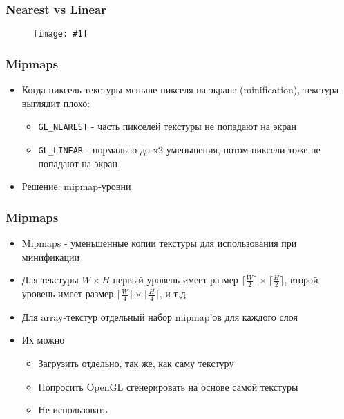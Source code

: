 \documentclass{beamer}
\newcommand{\slideimage}[1]{
  \begin{figure}
    \begin{adjustbox}{width=\textwidth, totalheight=\textheight-2\baselineskip-2\baselineskip,keepaspectratio}
      \texttt{[image: \#1]}
    \end{adjustbox}
  \end{figure}
}
\begin{document}
\begin{frame}
\frametitle{Nearest vs Linear}
\slideimage{nearest_linear.png}
\end{frame}

\begin{frame}[fragile]
\frametitle{Mipmaps}
\begin{itemize}
\item Когда пиксель текстуры меньше пикселя на экране (minification), текстура выглядит плохо:
\begin{itemize}
\item \verb|GL_NEAREST| - часть пикселей текстуры не попадают на экран
\item \verb|GL_LINEAR| - нормально до x2 уменьшения, потом пиксели тоже не попадают на экран
\end{itemize}
\pause
\item Решение: mipmap-уровни
\end{itemize}
\end{frame}

\begin{frame}[fragile]
\frametitle{Mipmaps}
\begin{itemize}
\item Mipmaps - уменьшенные копии текстуры для использования при минификации
\pause
\item Для текстуры \begin{math}W\times H\end{math} первый уровень имеет размер \begin{math}\lceil\frac{W}{2}\rceil\times \lceil\frac{H}{2}\rceil\end{math}, второй уровень имеет размер \begin{math}\lceil\frac{W}{4}\rceil\times \lceil\frac{H}{4}\rceil\end{math}, и т.д.
\item Для array-текстур отдельный набор mipmap'ов для каждого слоя
\pause
\item Их можно
\begin{itemize}
\item Загрузить отдельно, так же, как саму текстуру
\item Попросить OpenGL сгенерировать на основе самой текстуры
\item Не использовать
\end{itemize}
\end{itemize}
\end{frame}
\end{document}
